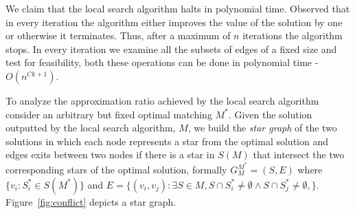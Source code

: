 \documentclass[draft]{article}
\begin{document}
We claim that the local search algorithm halts in polynomial time.
Observed that in every iteration the algorithm either improves the value of the solution
by one or otherwise it terminates. 
Thus, after a maximum of $n$ iterations the algorithm stops.
In every iteration we examine all the subsets of edges of a fixed size and test for feasibility,
both these operations can be done in polynomial time - $O(n^{Ck + 1})$. 

To analyze the approximation ratio achieved by the local search algorithm consider an 
arbitrary but fixed optimal matching $M^*$.
Given the solution outputted by the local search algorithm, 
$M$, 
we build the \emph{star graph} of the two solutions
in which each node represents a star from the optimal solution 
and edges exits between two nodes if
there is a star in $S(M)$ that intersect the two
corresponding stars of the optimal solution, 
formally $G^{M^*}_M = (S, E)$ where $\{v_i : S^*_i \in S(M^*) \}$ 
and 
$E = \{(v_i, v_j) : 
\exists S \in M,
S \cap S^*_i \neq \emptyset \land S \cap S^*_j \neq \emptyset,
\}$.
Figure~\ref{fig:conflict} depicts a star graph.
\end{document}

